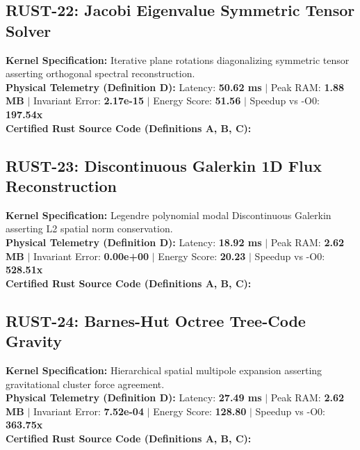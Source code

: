 \vspace{1em}
\subsection{RUST-22: Jacobi Eigenvalue Symmetric Tensor Solver}
\textbf{Kernel Specification:} Iterative plane rotations diagonalizing symmetric tensor asserting orthogonal spectral reconstruction.\\
\textbf{Physical Telemetry (Definition D):} Latency: \textbf{50.62 ms} $|$ Peak RAM: \textbf{1.88 MB} $|$ Invariant Error: \textbf{2.17e-15} $|$ Energy Score: \textbf{51.56} $|$ Speedup vs -O0: \textbf{197.54x}\\

\textbf{Certified Rust Source Code (Definitions A, B, C):}


\vspace{1em}
\subsection{RUST-23: Discontinuous Galerkin 1D Flux Reconstruction}
\textbf{Kernel Specification:} Legendre polynomial modal Discontinuous Galerkin asserting L2 spatial norm conservation.\\
\textbf{Physical Telemetry (Definition D):} Latency: \textbf{18.92 ms} $|$ Peak RAM: \textbf{2.62 MB} $|$ Invariant Error: \textbf{0.00e+00} $|$ Energy Score: \textbf{20.23} $|$ Speedup vs -O0: \textbf{528.51x}\\

\textbf{Certified Rust Source Code (Definitions A, B, C):}


\vspace{1em}
\subsection{RUST-24: Barnes-Hut Octree Tree-Code Gravity}
\textbf{Kernel Specification:} Hierarchical spatial multipole expansion asserting gravitational cluster force agreement.\\
\textbf{Physical Telemetry (Definition D):} Latency: \textbf{27.49 ms} $|$ Peak RAM: \textbf{2.62 MB} $|$ Invariant Error: \textbf{7.52e-04} $|$ Energy Score: \textbf{128.80} $|$ Speedup vs -O0: \textbf{363.75x}\\

\textbf{Certified Rust Source Code (Definitions A, B, C):}


